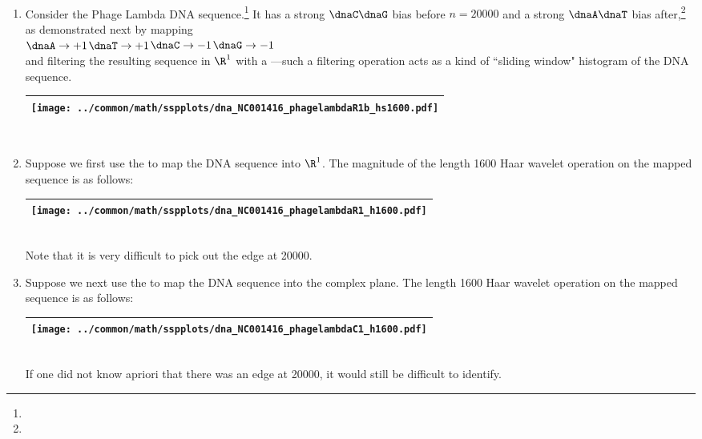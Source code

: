 \begin{example}
\label{ex:dnapl}
\mbox{}\\
\begin{enumerate}
  \item \label{item:dnapl_psp}
     Consider the Phage Lambda DNA sequence.\footnote{}
     It has a strong $\dnaC\dnaG$ bias before $n=20000$ and 
            a strong $\dnaA\dnaT$ bias after,\footnote{}
     as demonstrated next by mapping 
     \\\indentx$\dnaA\to+1$\qquad$\dnaT\to+1$\qquad$\dnaC\to-1$\qquad$\dnaG\to-1$\\
     and filtering the resulting sequence in $\R^1$
     with a  ---such
     a filtering operation acts as a kind of ``sliding window" histogram of the DNA sequence.
     \\\begin{tabular}{|>{\scs}c|}
          \hline
          \texttt{[image: ../common/math/sspplots/dna\_NC001416\_phagelambdaR1b\_hs1600.pdf]}%
        \\\hline
     \end{tabular}\\
  
  \item \label{item:dnapl_R1pam}
    Suppose we first use the   to map
    the DNA sequence into $\R^1$.
    The magnitude of the length 1600 Haar wavelet operation on the mapped sequence is as follows:
     \\\begin{tabular}{|>{\scs}c|}
          \hline
          \texttt{[image: ../common/math/sspplots/dna\_NC001416\_phagelambdaR1\_h1600.pdf]}%
        \\\hline
     \end{tabular}\\
    Note that it is very difficult to pick out the edge at 20000.

  \item \label{item:dnapl_C1qpsk}
    Suppose we next use the   to map
    the DNA sequence into the complex plane.
    The length 1600 Haar wavelet operation on the mapped sequence is as follows:
     \\\begin{tabular}{|>{\scs}c|}
          \hline
          \texttt{[image: ../common/math/sspplots/dna\_NC001416\_phagelambdaC1\_h1600.pdf]}%
        \\\hline
     \end{tabular}\\
     If one did not know apriori that there was an edge at 20000, it would still be difficult to identify.
     

\end{enumerate}
\end{example}
